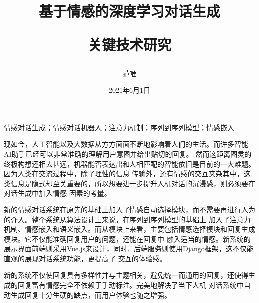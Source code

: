 \documentclass[supercite]{HustGraduPaper}
\title{基于情感的深度学习对话生成

关键技术研究}
\author{范唯}
\date{2021年6月1日}
\theoremstyle{definition}
\begin{document}
\maketitle

\statement

\clearpage


\begin{cnabstract}{情感对话生成；情感对话机器人；注意力机制；序列到序列模型；情感嵌入}

现如今，人工智能以及大数据从方方面面不断地影响着人们的生活。而许多智能AI助手已经可以非常准确的理解用户意图并给出贴切的回复。
然而这距离图灵的终极构想还相去甚远，机器能否表达出和人相匹配的智能依旧是目前的一大难题。因为人类在交流过程中，除了理性的信息
传输外，还有情感的交互夹杂其中，这类信息是隐式却至关重要的，所以想要进一步提升人机对话的沉浸感，则必须要在对话生成中加入情感
因素的考量。

新的情感对话系统在原先的基础上加入了情感自动选择模块，而不需要再进行人为的介入。整个系统从算法设计上来说，在序列到序列模型的基础上
加入了注意力机制、情感嵌入和语义嵌入。而从模块上来看，主要包括情感选择模块和回复生成模块。它不仅能准确回复用户的问题，还能在回复中
融入适当的情感。新系统的展示界面前端则采用Vue.js来设计，同时，后端服务则使用Django框架，这不仅能直观的展现对话系统功能，更提高了
交互的体验感。

新的系统不仅使回复具有多样性并与主题相关，避免统一而通用的回复，还使得生成的回复富有情感完全不依赖于手动标注。完美地解决了当下人机
对话系统中自动生成回复十分生硬的缺点，而用户体验也随之增强。


\end{cnabstract}
\end{document}
